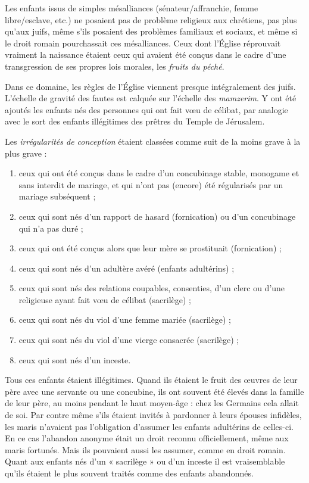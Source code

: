  Les enfants issus de simples mésalliances (sénateur/affranchie, femme libre/esclave, etc.) ne posaient pas de problème religieux aux chrétiens, pas plus qu'aux juifs, même s'ils posaient des problèmes familiaux et sociaux, et même si le droit romain pourchassait ces mésalliances. Ceux dont l'Église réprouvait vraiment la naissance étaient ceux qui avaient été conçus dans le cadre d'une transgression de ses propres lois morales, les \emph{fruits du péché}. 

 Dans ce domaine, les règles de l'Église viennent presque intégralement des juifs. L'échelle de gravité des fautes est calquée sur l'échelle des \emph{mamzerim}. Y ont été ajoutés les enfants nés des personnes qui ont fait vœu de célibat, par analogie avec le sort des enfants illégitimes des prêtres du Temple de Jérusalem. 

 Les \emph{irrégularités de conception} étaient classées comme suit de la moins grave à la plus grave :
\begin{enumerate}
\item ceux qui ont été conçus dans le cadre d'un concubinage stable, monogame et sans interdit de mariage, et qui n'ont pas (encore) été régularisés par un mariage subséquent ;
\item ceux qui sont nés d'un rapport de hasard (fornication) ou d'un concubinage qui n'a pas duré ;
\item ceux qui ont été conçus alors que leur mère se prostituait (fornication) ;
\item ceux qui sont nés d'un adultère avéré (enfants adultérins) ;
\item ceux qui sont nés des relations coupables, consenties, d'un clerc ou d'une religieuse ayant fait vœu de célibat (sacrilège) ;
\item ceux qui sont nés du viol d'une femme mariée (sacrilège) ;
\item ceux qui sont nés du viol d'une vierge consacrée (sacrilège) ;
\item ceux qui sont nés d'un inceste. 
\end{enumerate}

 Tous ces enfants étaient illégitimes. Quand ils étaient le fruit des œuvres de leur père avec une servante ou une concubine, ils ont souvent été élevés dans la famille de leur père, au moins pendant le haut moyen-âge : chez les Germains cela allait de soi. Par contre même s'ils étaient invités à pardonner à leurs épouses infidèles, les maris n'avaient pas l'obligation d'assumer les enfants adultérins de celles-ci. En ce cas l'abandon anonyme était un droit reconnu officiellement, même aux maris fortunés. Mais ils pouvaient aussi les assumer, comme en droit romain. Quant aux enfants nés d'un « sacrilège » ou d'un inceste il est vraisemblable qu'ils étaient le plus souvent traités comme des enfants abandonnés.


